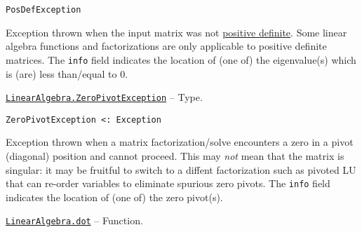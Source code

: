 \begin{adjustwidth}{2em}{0pt}


\begin{verbatim}
PosDefException
\end{verbatim}

Exception thrown when the input matrix was not \href{https://en.wikipedia.org/wiki/Definiteness\_of\_a\_matrix}{positive definite}. Some linear algebra functions and factorizations are only applicable to positive definite matrices. The \texttt{info} field indicates the location of (one of) the eigenvalue(s) which is (are) less than/equal to 0.



\end{adjustwidth}
\hypertarget{5527602249593606173}{}
\hyperlink{5527602249593606173}{\texttt{LinearAlgebra.ZeroPivotException}}  -- {Type.}

\begin{adjustwidth}{2em}{0pt}


\begin{verbatim}
ZeroPivotException <: Exception
\end{verbatim}

Exception thrown when a matrix factorization/solve encounters a zero in a pivot (diagonal) position and cannot proceed.  This may \emph{not} mean that the matrix is singular: it may be fruitful to switch to a diffent factorization such as pivoted LU that can re-order variables to eliminate spurious zero pivots. The \texttt{info} field indicates the location of (one of) the zero pivot(s).



\end{adjustwidth}
\hypertarget{15449777733236645501}{}
\hyperlink{15449777733236645501}{\texttt{LinearAlgebra.dot}}  -- {Function.}

